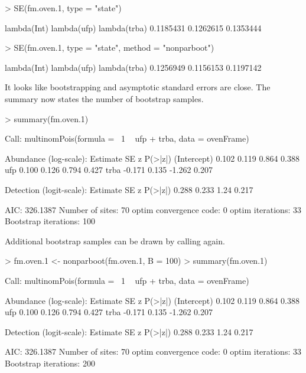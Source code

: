 \documentclass[article,shortnames]{jss}
\begin{document}
\begin{Schunk}
\begin{Sinput}
> SE(fm.oven.1, type = "state")
\end{Sinput}
\begin{Soutput}
 lambda(Int)  lambda(ufp) lambda(trba) 
   0.1185431    0.1262615    0.1353444 
\end{Soutput}
\begin{Sinput}
> SE(fm.oven.1, type = "state", method = "nonparboot")
\end{Sinput}
\begin{Soutput}
 lambda(Int)  lambda(ufp) lambda(trba) 
   0.1256949    0.1156153    0.1197142 
\end{Soutput}
\end{Schunk}

It looks like bootstrapping and asymptotic standard errors are close.
The summary now states the number of bootstrap samples.

\begin{Schunk}
\begin{Sinput}
> summary(fm.oven.1)
\end{Sinput}
\begin{Soutput}
Call:
multinomPois(formula = ~1 ~ ufp + trba, data = ovenFrame)

Abundance (log-scale):
            Estimate    SE      z P(>|z|)
(Intercept)    0.102 0.119  0.864   0.388
ufp            0.100 0.126  0.794   0.427
trba          -0.171 0.135 -1.262   0.207

Detection (logit-scale):
 Estimate    SE    z P(>|z|)
    0.288 0.233 1.24   0.217

AIC: 326.1387 
Number of sites: 70
optim convergence code: 0
optim iterations: 33 
Bootstrap iterations: 100 
\end{Soutput}
\end{Schunk}

Additional bootstrap samples can be drawn by calling  again.
\begin{Schunk}
\begin{Sinput}
> fm.oven.1 <- nonparboot(fm.oven.1, B = 100)
> summary(fm.oven.1)
\end{Sinput}
\begin{Soutput}
Call:
multinomPois(formula = ~1 ~ ufp + trba, data = ovenFrame)

Abundance (log-scale):
            Estimate    SE      z P(>|z|)
(Intercept)    0.102 0.119  0.864   0.388
ufp            0.100 0.126  0.794   0.427
trba          -0.171 0.135 -1.262   0.207

Detection (logit-scale):
 Estimate    SE    z P(>|z|)
    0.288 0.233 1.24   0.217

AIC: 326.1387 
Number of sites: 70
optim convergence code: 0
optim iterations: 33 
Bootstrap iterations: 200 
\end{Soutput}
\end{Schunk}
\end{document}
